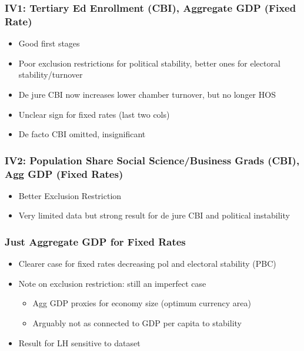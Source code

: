 \documentclass[]{beamer}
\begin{document}
    \begin{frame}
        \frametitle{IV1: Tertiary Ed Enrollment (CBI), Aggregate GDP (Fixed Rate)}
        \begin{itemize}
            \item Good first stages
            \item Poor exclusion restrictions for political stability, better ones for electoral stability/turnover
            \item De jure CBI now increases lower chamber turnover, but no longer HOS
            \item Unclear sign for fixed rates (last two cols)
            \item De facto CBI omitted, insignificant
        \end{itemize}
        
        
    \end{frame}


    \begin{frame}
        \frametitle{IV2: Population Share Social Science/Business Grads (CBI), Agg GDP (Fixed Rates)}
        \begin{itemize}
            \item Better Exclusion Restriction
            \item Very limited data but strong result for de jure CBI and political instability
        \end{itemize}
        
        
    \end{frame}


    \begin{frame}
        \frametitle{Just Aggregate GDP for Fixed Rates}
        \begin{itemize}
            \item Clearer case for fixed rates decreasing pol and electoral stability (PBC)
            \item Note on exclusion restriction: still an imperfect case
            \begin{itemize}
                \item Agg GDP proxies for economy size (optimum currency area)
                \item Arguably not as connected to GDP per capita to stability
            \end{itemize}
            \item Result for LH sensitive to dataset
        \end{itemize}
        
    \end{frame}
\end{document}
